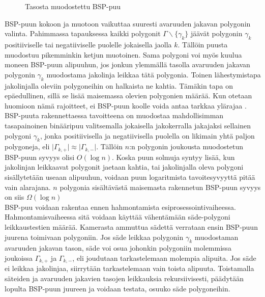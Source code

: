 \documentclass[a4paper,12pt, titlepage]{article}
\newcommand{\abs}[1]{\vert #1 \vert} %
\begin{document}
\begin{figure}
 \centering
 \caption{Tasosta muodostettu BSP-puu}
 \label{bsp3}
\end{figure}

BSP-puun kokoon ja muotoon vaikuttaa suuresti avaruuden jakavan polygonin valinta. Pahimmassa tapauksessa kaikki polygonit $\Gamma\backslash\{\gamma_k\}$ jäävät polygonin $\gamma_k$ positiiviselle tai negatiiviselle puolelle jokaisella jaolla $k$. Tällöin puusta muodostuu pikemminkin ketjun muotoinen. Sama polygoni voi myös kuulua moneen BSP-puun alipuuhun, jos jonkun ylemmällä tasolla avaruuden jakavan polygonin $\gamma_k$ muodostama jakolinja leikkaa tätä polygonia. \citep[.]{samet} Toinen lähestymistapa jakolinjalla oleviin polygoneihin on halkaista ne kahtia. Tämäkin tapa on epäedullinen, sillä se lisää maisemassa olevien polygonien määrää. \citep[.]{ranta} Kun otetaan huomioon nämä rajoitteet, ei BSP-puun koolle voida antaa tarkkaa ylärajaa \citep{hughes}.\\

BSP-puuta rakennettaessa tavoitteena on muodostaa mahdollisimman tasapainoinen binääripuu valitsemalla jokaisella jakokerralla jakajaksi sellainen polygoni $\gamma_k$, jonka positiivisella ja negatiivisella puolella on likimain yhtä paljon polygoneja, eli $\abs{\Gamma_{k,+}} \approx \abs{\Gamma_{k,-}}$. Tällöin  $n$:n polygonin joukousta muodostetun BSP-puun syvyys olisi $O(\log n)$. Koska puun solmuja syntyy lisää, kun jakolinjan leikkaavat polygonit jaetaan kahtia, tai jakolinjalla oleva polygoni sisällytetään useaan alipuuhun, voidaan puun logaritmista tavoitesyvyyttä pitää vain alarajana. \citep[.]{hughes} $n$ polygonia sisältävästä maisemasta rakennetun BSP-puun syvyys on siis $\Omega(\log n)$\\

BSP-puu voidaan rakentaa ennen hahmontamista esiprosessointivaiheessa. Hahmontamisvaiheessa sitä voidaan käyttää vähentämään säde-polygoni leikkaustestien määrää. Kamerasta ammuttua sädettä verrataan ensin BSP-puun juurena toimivaan polygoniin. Jos säde leikkaa polygonin $\gamma_k$ muodostaman avaruuden jakavan tason, säde voi osua johonkin polygoniin molemmissa joukoissa ${\Gamma_{k,+}}$ ja ${\Gamma_{k,-}}$, eli joudutaan tarkastelemaan molempia alipuita. Jos säde ei leikkaa jakolinjaa, siirrytään tarkastelemaan vain toista alipuuta. Toistamalla säteiden ja avaruuden jakavien tasojen leikkauksia rekursiivisesti, päädytään lopulta BSP-puun juureen ja voidaan testata, osuuko säde polygoneihin.\citep{ranta}\\
\end{document}
